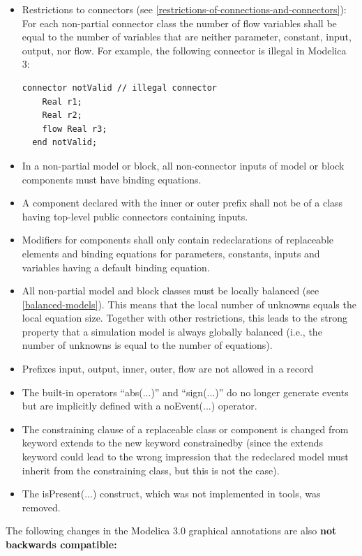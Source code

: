 \documentclass[10pt,a4paper]{report}
\begin{document}
\begin{itemize}
\item
  Restrictions to connectors (see \ref{restrictions-of-connections-and-connectors}): For each non-partial
  connector class the number of flow variables shall be equal to the
  number of variables that are neither parameter, constant, input,
  output, nor flow. For example, the following connector is illegal in
  Modelica 3:
  \begin{lstlisting}[language=modelica]
  connector notValid // illegal connector
    Real r1;
    Real r2;
    flow Real r3;
  end notValid;
  \end{lstlisting}
\item
  In a non-partial model or block, all non-connector inputs of model or
  block components must have binding equations.
\item
  A component declared with the inner or outer prefix shall not be of a
  class having top-level public connectors containing inputs.
\item
  Modifiers for components shall only contain redeclarations of
  replaceable elements and binding equations for parameters, constants,
  inputs and variables having a default binding equation.
\item
  All non-partial model and block classes must be locally balanced (see
  \ref{balanced-models}). This means that the local number of unknowns equals the
  local equation size. Together with other restrictions, this leads to
  the strong property that a simulation model is always globally
  balanced (i.e., the number of unknowns is equal to the number of
  equations).
\item
  Prefixes input, output, inner, outer, flow are not allowed in a record
\item
  The built-in operators ``abs(...)'' and ``sign(...)'' do no longer
  generate events but are implicitly defined with a noEvent(...)
  operator.
\item
  The constraining clause of a replaceable class or component is changed
  from keyword extends to the new keyword constrainedby (since the
  extends keyword could lead to the wrong impression that the redeclared
  model must inherit from the constraining class, but this is not the
  case).
\item
  The isPresent(...) construct, which was not implemented in tools, was
  removed.
\end{itemize}

The following changes in the Modelica 3.0 graphical annotations are also
\textbf{not backwards compatible:}
\end{document}
